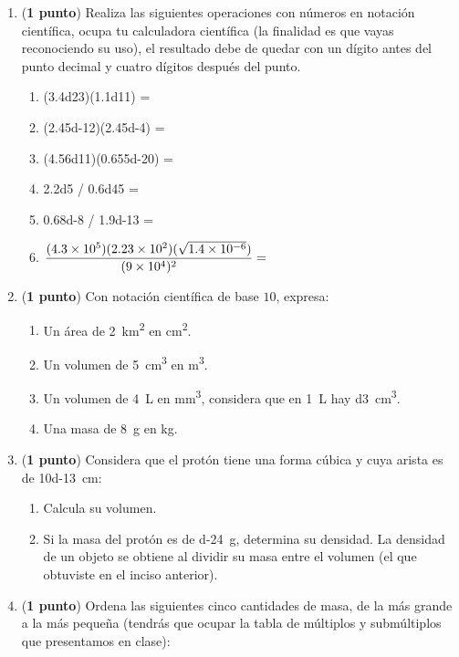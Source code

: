 \documentclass[14pt]{extarticle}
\begin{document}
\begin{enumerate}
\item (\textbf{1 punto}) Realiza las siguientes operaciones con números en notación científica, ocupa tu calculadora científica (la finalidad es que vayas reconociendo su uso), el resultado debe de quedar con un dígito antes del punto decimal y cuatro dígitos después del punto.
\begin{enumerate}
    \item (\num{3.4d23})(\num{1.1d11}) = 
    \item (\num{2.45d-12})(\num{2.45d-4}) =
    \item (\num{4.56d11})(\num{0.655d-20}) =
    \item \num{2.2d5} / \num{0.6d45} =
    \item \num{0.68d-8} / \num{1.9d-13} =
    \item $\dfrac{(\num{4.3d5})(\num{2.23d2})(\sqrt{\num{1.4d-6}})}{(\num{9d4})^{2}}=$
\end{enumerate}
\item (\textbf{1 punto}) Con notación científica de base $10$, expresa:
\begin{enumerate}
\item Un área de \SI{2}{\square\kilo\meter} en \unit{\square\centi\meter}.
\item Un volumen de \SI{5}{\cubic\centi\meter} en \unit{\cubic\meter}.
\item Un volumen de \SI{4}{\liter} en \unit{\cubic\milli\meter}, considera que en \SI{1}{\liter} hay \SI{d3}{\cubic\centi\meter}.
\item Una masa de \SI{8}{\gram} en \unit{\kilo\gram}.
\end{enumerate}
\item (\textbf{1 punto}) Considera que el protón tiene una forma cúbica y cuya arista es de \SI{10d-13}{\centi\meter}:
\begin{enumerate}
\item Calcula su volumen.
\item Si la masa del protón es de \SI{d-24}{\gram}, determina su densidad. La densidad de un objeto se obtiene al dividir su masa entre el volumen (el que obtuviste en el inciso anterior).
\end{enumerate}
\item (\textbf{1 punto}) Ordena las siguientes cinco cantidades de masa, de la más grande a la más pequeña (tendrás que ocupar la tabla de múltiplos y submúltiplos que presentamos en clase):
\begin{enumerate}

\end{enumerate}
\end{enumerate}
\end{document}
